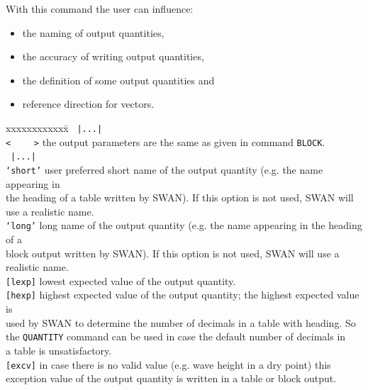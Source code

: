 \documentclass[12pt]{book}
\begin{document}
\noindent
With this command the user can influence:
\begin{itemize}
   \item the naming of output quantities,
   \item the accuracy of writing output quantities,
   \item the definition of some output quantities and
   \item reference direction for vectors.
\end{itemize}

\begin{tabbing}
 xxxxxxxxxxxx\= \kill
\, {\tt  |...|}    \> \\
{\tt <} \, \, \, \, {\tt >} \> the output parameters are the same as given in command {\tt BLOCK}.\\
\, {\tt  |...|}    \> \\
{\tt `short'}      \> user preferred short name of the output quantity (e.g. the name appearing in\+\\
                      the heading of a table written by SWAN). If this option is not used, SWAN will\\
                      use a realistic name.\-\\
{\tt `long'}       \> long name of the output quantity (e.g. the name appearing in the heading of a\+\\
                      block output written by SWAN). If this option is not used, SWAN will use a\\
                      realistic name.\-\\
{\tt [lexp]}       \> lowest expected value of the output quantity.\\
{\tt [hexp]}       \> highest expected value of the output quantity; the highest expected value is\+\\
                      used by SWAN to determine the number of decimals in a table with heading. So\\
                      the {\tt QUANTITY} command can be used in case the default number of decimals in\\
                      a table is unsatisfactory.\-\\
{\tt [excv]}       \> in case there is no valid value (e.g. wave height in a dry point) this\+\\
                      exception value of the output quantity is written in a table or block output.\-\\
\end{tabbing}
\end{document}
